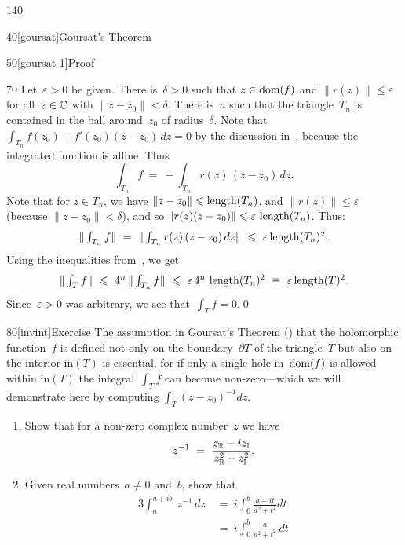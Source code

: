 \begin{parsec}{140}
\begin{point}{40}[goursat]{Goursat's Theorem}
\begin{point}{50}[goursat-1]{Proof}
\begin{point}{70}
Let~$\varepsilon >0$ be given.
There is~$\delta>0$
such that $z\in\operatorname{dom}(f)$
and $\|r(z)\|\leq \varepsilon$
for all~$z\in \mathbb{C}$ with $\|z-z_0\|<\delta$.
There is~$n$ such that the triangle~$T_n$ is contained
in the ball around~$z_0$ of radius~$\delta$.
Note that $\int_{T_n} f(z_0)+f'(z_0)(z-z_0)\,dz=0$
by the discussion in~, because
the integrated function is affine.
Thus
\begin{equation*}
\textstyle
\int_{T_n} f \  = \ -\int_{T_n}r(z)\,(z-z_0)\,dz.
\end{equation*}
Note that for $z\in T_n$,
we have  $\|z-z_0\|\leqslant \operatorname{length}(T_n)$,
and $\|r(z)\|\leq \varepsilon$ (because $\|z-z_0\|< \delta$),
and so $\|r(z)(z-z_0)\|\leqslant \varepsilon\,\operatorname{length}(T_n)$.
Thus:
\begin{equation*}
\textstyle
\|\int_{T_n} f\| \  = \ \|\int_{T_n}r(z)\,(z-z_0)\,dz\|
\ \leqslant\ \varepsilon\operatorname{length}(T_n)^2.
\end{equation*}
Using the inequalities from~,
we get
\begin{equation*}
\textstyle
\|\int_T f\|\ \leqslant\ 4^n\, \|\int_{T_n} f\|
\ \leqslant\ \varepsilon \,4^n\,\operatorname{length}(T_n)^2 
\ \equiv\ \varepsilon \operatorname{length}(T)^2.
\end{equation*}
Since~$\varepsilon>0$ was arbitrary,
we see that~$\int_T f=0$.\qed
\end{point}
\end{point}
\end{point}%
\begin{point}{80}[invint]{Exercise}%
	The assumption in Goursat's Theorem ()
that the holomorphic function~$f$
is defined not only on the boundary~$\partial T$
of the triangle~$T$
but also on the interior $\mathrm{in}(T)$
is essential,
for if only a single hole in~$\operatorname{dom}(f)$ is allowed within $\mathrm{in}(T)$
the integral~$\int_T f$ can become non-zero---which we will demonstrate
here by computing
$\int_T (z-z_0)^{-1}dz$.
\begin{enumerate}%
\item
Show that for a non-zero
complex number~$z$ we have
\begin{equation*}
	z^{-1}\ =\  \frac{\Real{z}-i\Imag{z}}{\Real{z}^2+\Imag{z}^2}.
\end{equation*}
\item
Given real numbers~$a\neq 0$ and~$b$,
show that
\begin{alignat*}{3}
	\int_{a}^{a+ib}\ 
	z^{-1}\,dz
	\ &=\ 
	i\int_{0}^b \frac{a-it}{a^2+t^2}dt
	\\
	\ &=\ 
	i\int_0^b \frac{a}{a^2+t^2}\,dt 

\end{alignat*}
\end{enumerate}
\end{point}
\end{parsec}
